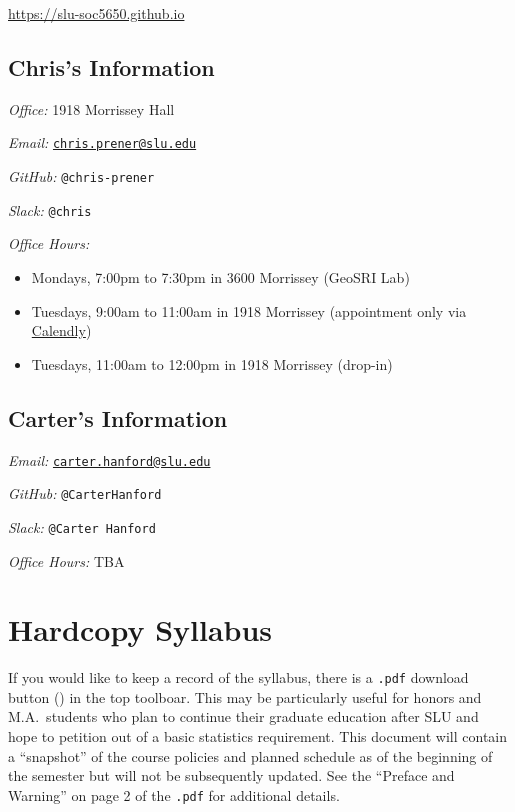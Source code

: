 \documentclass[
]{book}
\providecommand{\tightlist}{%
  \setlength{\itemsep}{0pt}\setlength{\parskip}{0pt}}
\begin{document}
\url{https://slu-soc5650.github.io}

\hypertarget{chriss-information}{%
\subsection*{Chris's Information}\label{chriss-information}}

\emph{Office:} 1918 Morrissey Hall

\emph{Email:} \href{mailto:chris.prener@slu.edu}{\nolinkurl{chris.prener@slu.edu}}

\emph{GitHub:} \texttt{@chris-prener}

\emph{Slack:} \texttt{@chris}

\emph{Office Hours:}

\begin{itemize}
\tightlist
\item
  Mondays, 7:00pm to 7:30pm in 3600 Morrissey (GeoSRI Lab)
\item
  Tuesdays, 9:00am to 11:00am in 1918 Morrissey (appointment only via \href{https://calendly.com/chris-prener}{Calendly})
\item
  Tuesdays, 11:00am to 12:00pm in 1918 Morrissey (drop-in)
\end{itemize}

\hypertarget{carters-information}{%
\subsection*{Carter's Information}\label{carters-information}}

\emph{Email:} \href{mailto:carter.hanford@slu.edu}{\nolinkurl{carter.hanford@slu.edu}}

\emph{GitHub:} \texttt{@CarterHanford}

\emph{Slack:} \texttt{@Carter\ Hanford}

\emph{Office Hours:} TBA

\hypertarget{hardcopy-syllabus}{%
\section*{Hardcopy Syllabus}\label{hardcopy-syllabus}}

If you would like to keep a record of the syllabus, there is a \texttt{.pdf} download button () in the top toolboar. This may be particularly useful for honors and M.A.~students who plan to continue their graduate education after SLU and hope to petition out of a basic statistics requirement. This document will contain a ``snapshot'' of the course policies and planned schedule as of the beginning of the semester but will not be subsequently updated. See the ``Preface and Warning'' on page 2 of the \texttt{.pdf} for additional details.
\end{document}
